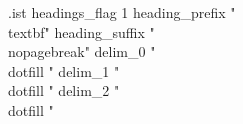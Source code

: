 \makeatletter
\newcommand \indexdotfill {\leavevmode \cleaders \hb@xt@ .44em{\hss .\hss }\hfill \kern \z@}
\makeatother

\begin{filecontents*}{\jobname.ist}
  headings_flag 1
  heading_prefix "{\\textbf{"
  heading_suffix "}}\\nopagebreak\n"
  delim_0 " \\dotfill "
  delim_1 " \\dotfill "
  delim_2 " \\dotfill "
\end{filecontents*}

\newcommand{\printindices}
{
  \printindex
  \printindex[region]
  \printindex[ingredient]
}